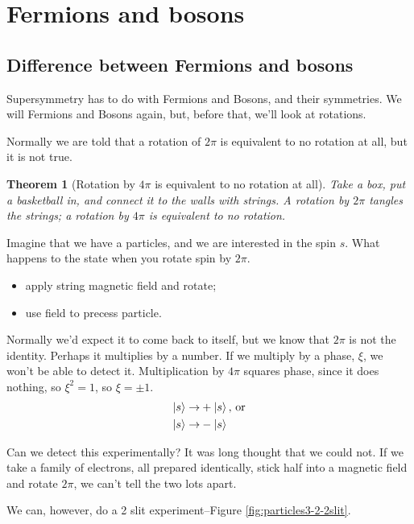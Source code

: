 \documentclass[]{article}
\newtheorem{thm}{Theorem}
\begin{document}
\section{Fermions and bosons}

\subsection{Difference between Fermions and bosons}
Supersymmetry has to do with Fermions and Bosons, and their symmetries. We will Fermions and Bosons again, but, before that, we'll look at rotations.

Normally we are told that a rotation of $2\pi$ is equivalent to no rotation at all, but it is not true.

\begin{thm}[Rotation by $4\pi$ is equivalent to no rotation at all]
	Take a box, put a basketball in, and connect it to the walls with strings. A rotation by $2\pi$ tangles the strings; a rotation by $4\pi$ is equivalent to no rotation.
\end{thm}

Imagine that we have a particles, and we are interested in the spin $s$. What happens to the state when you rotate spin by $2\pi$.
\begin{itemize}
	\item apply string magnetic field and rotate;
	\item use field to precess particle.
\end{itemize}

Normally we'd expect it to come back to itself, but we know that $2\pi$ is not the identity. Perhaps it multiplies by a number. If we multiply by a phase, $\xi$, we won't be able to detect it. Multiplication by $4\pi$ squares phase, since it does nothing, so $\xi^2=1$, so $\xi=\pm1$.
\begin{align*}
	\ket{s} \rightarrow& +\ket{s} \text{, or}\\
	\ket{s} \rightarrow& -\ket{s}
\end{align*}

Can we detect this experimentally? It was long thought that we could not. If we take a family of electrons, all prepared identically, stick half into a magnetic field and rotate $2\pi$, we can't tell the two lots apart.

We can, however, do a 2 slit experiment\cite{aharonov1967observability}--Figure \ref{fig:particles3-2-2slit}.
\end{document}
